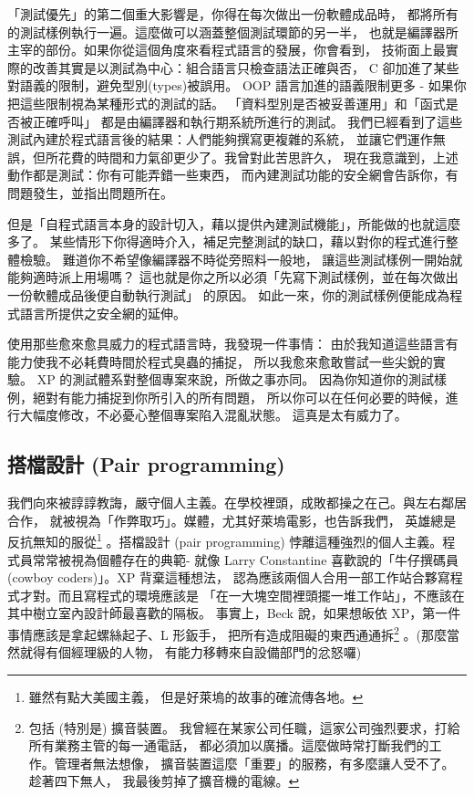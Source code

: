 「測試優先」的第二個重大影響是，你得在每次做出一份軟體成品時，
都將所有的測試樣例執行一遍。這麼做可以涵蓋整個測試環節的另一半，
也就是編譯器所主宰的部份。如果你從這個角度來看程式語言的發展，你會看到，
技術面上最實際的改善其實是以測試為中心：組合語言只檢查語法正確與否，
C 卻加進了某些對語義的限制，避免型別(types)被誤用。
OOP 語言加進的語義限制更多 - 如果你把這些限制視為某種形式的測試的話。
「資料型別是否被妥善運用」和「函式是否被正確呼叫」
都是由編譯器和執行期系統所進行的測試。
我們已經看到了這些測試內建於程式語言後的結果：人們能夠撰寫更複雜的系統，
並讓它們運作無誤，但所花費的時間和力氣卻更少了。我曾對此苦思許久，
現在我意識到，上述動作都是測試：你有可能弄錯一些東西，
而內建測試功能的安全網會告訴你，有問題發生，並指出問題所在。

但是「自程式語言本身的設計切入，藉以提供內建測試機能」，所能做的也就這麼多了。
某些情形下你得適時介入，補足完整測試的缺口，藉以對你的程式進行整體檢驗。
難道你不希望像編譯器不時從旁照料一般地，
讓這些測試樣例一開始就能夠適時派上用場嗎？
這也就是你之所以必須「先寫下測試樣例，並在每次做出一份軟體成品後便自動執行測試」
的原因。 如此一來，你的測試樣例便能成為程式語言所提供之安全網的延伸。

使用那些愈來愈具威力的程式語言時，我發現一件事情：
由於我知道這些語言有能力使我不必耗費時間於程式臭蟲的捕捉，
所以我愈來愈敢嘗試一些尖銳的實驗。 XP 的測試體系對整個專案來說，所做之事亦同。
因為你知道你的測試樣例，絕對有能力捕捉到你所引入的所有問題，
所以你可以在任何必要的時候，進行大幅度修改，不必憂心整個專案陷入混亂狀態。
這真是太有威力了。
\subsection{搭檔設計 (Pair programming)}
我們向來被諄諄教誨，嚴守個人主義。在學校裡頭，成敗都操之在己。與左右鄰居合作，
就被視為「作弊取巧」。媒體，尤其好萊塢電影，也告訴我們，
英雄總是反抗無知的服從\footnote{雖然有點大美國主義，
但是好萊塢的故事的確流傳各地。} 。搭檔設計 (pair programming)
悖離這種強烈的個人主義。程式員常常被視為個體存在的典範- 就像 Larry Constantine 
喜歡說的「牛仔撰碼員(cowboy coders)」。XP 背棄這種想法，
認為應該兩個人合用一部工作站合夥寫程式才對。而且寫程式的環境應該是
「在一大塊空間裡頭擺一堆工作站」，不應該在其中樹立室內設計師最喜歡的隔板。
事實上，Beck 說，如果想皈依 XP，第一件事情應該是拿起螺絲起子、L 形鈑手，
把所有造成阻礙的東西通通拆\footnote{包括 (特別是) 擴音裝置。
我曾經在某家公司任職，這家公司強烈要求，打給所有業務主管的每一通電話，
都必須加以廣播。這麼做時常打斷我們的工作。管理者無法想像，
擴音裝置這麼「重要」的服務，有多麼讓人受不了。趁著四下無人，
我最後剪掉了擴音機的電線。} 。(那麼當然就得有個經理級的人物，
有能力移轉來自設備部門的忿怒囉)

